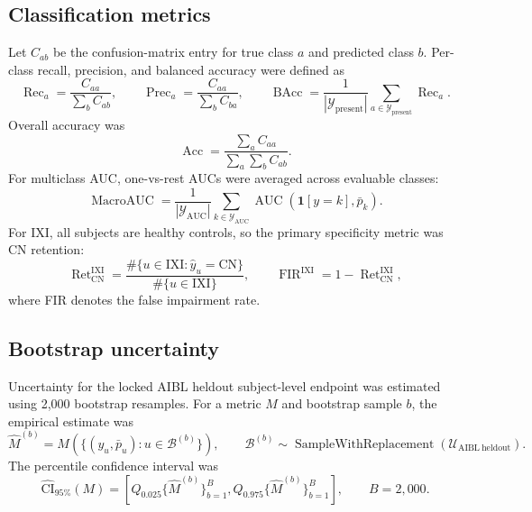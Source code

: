 \subsection{Classification metrics}
\label{sec:metrics}

Let $C_{ab}$ be the confusion-matrix entry for true class $a$ and predicted class $b$. Per-class recall, precision, and balanced accuracy were defined as
\begin{equation}
\operatorname{Rec}_a =
\frac{C_{aa}}{\sum_b C_{ab}},
\qquad
\operatorname{Prec}_a =
\frac{C_{aa}}{\sum_b C_{ba}},
\qquad
\operatorname{BAcc} =
\frac{1}{|\mathcal{Y}_{\mathrm{present}}|}
\sum_{a\in\mathcal{Y}_{\mathrm{present}}}\operatorname{Rec}_a .
\label{eq:metrics}
\end{equation}
Overall accuracy was
\begin{equation}
\operatorname{Acc}=
\frac{\sum_a C_{aa}}{\sum_a\sum_b C_{ab}}.
\label{eq:accuracy}
\end{equation}
For multiclass AUC, one-vs-rest AUCs were averaged across evaluable classes:
\begin{equation}
\operatorname{MacroAUC}=
\frac{1}{|\mathcal{Y}_{\mathrm{AUC}}|}
\sum_{k\in\mathcal{Y}_{\mathrm{AUC}}}
\operatorname{AUC}
\left(\mathbf{1}[y=k],\bar{p}_{k}\right).
\label{eq:macro_auc}
\end{equation}
For IXI, all subjects are healthy controls, so the primary specificity metric was CN retention:
\begin{equation}
\operatorname{Ret}^{\mathrm{IXI}}_{\mathrm{CN}}
=
\frac{\#\{u\in\mathrm{IXI}:\hat{y}_u=\mathrm{CN}\}}
{\#\{u\in\mathrm{IXI}\}},
\qquad
\operatorname{FIR}^{\mathrm{IXI}}=1-\operatorname{Ret}^{\mathrm{IXI}}_{\mathrm{CN}},
\label{eq:ixi_retention}
\end{equation}
where FIR denotes the false impairment rate.

\subsection{Bootstrap uncertainty}
\label{sec:bootstrap}

Uncertainty for the locked AIBL heldout subject-level endpoint was estimated using 2{,}000 bootstrap resamples. For a metric $M$ and bootstrap sample $b$, the empirical estimate was
\begin{equation}
\hat{M}^{(b)}
=
M\left(\{(y_u,\bar{p}_u):u\in\mathcal{B}^{(b)}\}\right),
\qquad
\mathcal{B}^{(b)}
\sim
\operatorname{SampleWithReplacement}(\mathcal{U}_{\mathrm{AIBL\ heldout}}).
\label{eq:bootstrap}
\end{equation}
The percentile confidence interval was
\begin{equation}
\widehat{\mathrm{CI}}_{95\%}(M)
=
\left[
Q_{0.025}\{\hat{M}^{(b)}\}_{b=1}^{B},
Q_{0.975}\{\hat{M}^{(b)}\}_{b=1}^{B}
\right],
\qquad B=2{,}000 .
\label{eq:bootstrap_ci}
\end{equation}

